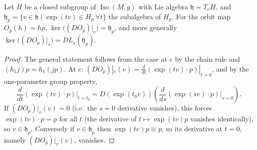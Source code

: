 \begin{proposition}
  \label{prop:pet-ch5-orbit-map-differential}
  Let $H$ be a closed subgroup of $\operatorname{Iso}(M,g)$ with Lie algebra
  $\mathfrak h=T_eH$, and $\mathfrak h_p=\{v\in\mathfrak h\mid\exp(tv)\in H_p\ \forall t\}$
  the subalgebra of $H_p$. For the orbit map $O_p(h)=hp$,
  $\ker\big((DO_p)|_v\big)=\mathfrak h_p$, and more generally
  $\ker\big((DO_p)|_s\big)=DL_s(\mathfrak h_p)$.
\end{proposition}
\begin{proof}
  The general statement follows from the case at $e$ by the chain rule and
  $(h_1j)p=h_1(jp)$. At $e$: $(DO_p)|_v(v)=\frac{d}{dt}(\exp(tv)\cdot p)|_{t=0}$, and
  by the one-parameter group property,
  \[
    \frac{d}{dt}(\exp(tv)\cdot p)\Big|_{t=t_0}
    =D(\exp(t_0v))\left(\frac{d}{ds}(\exp(sv)\cdot p)\Big|_{s=0}\right).
  \]
  If $(DO_p)|_v(v)=0$ (i.e.\ the $s=0$ derivative vanishes), this forces
  $\exp(tv)\cdot p=p$ for all $t$ (the derivative of $t\mapsto\exp(tv)p$ vanishes
  identically), so $v\in\mathfrak h_p$. Conversely if $v\in\mathfrak h_p$ then
  $\exp(tv)p\equiv p$, so its derivative at $t=0$, namely $(DO_p)|_v(v)$, vanishes.
\end{proof}

